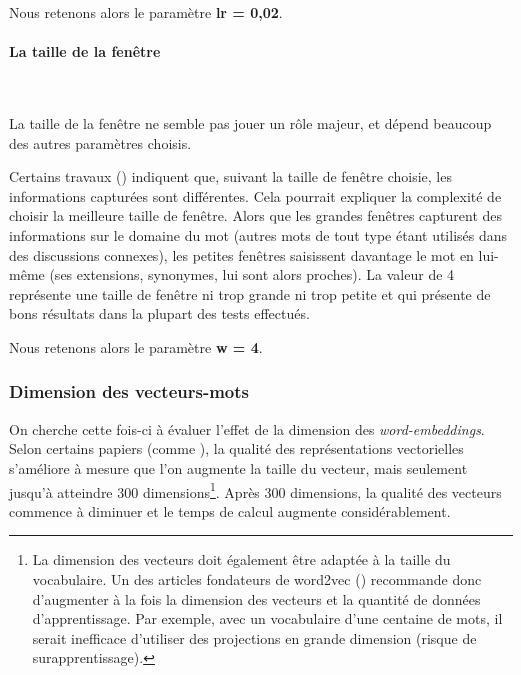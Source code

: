 \documentclass[11pt,french,french]{article}
\let\rmarkdownfootnote\footnote%
\def\footnote{\protect\rmarkdownfootnote}
\begin{document}
\faArrowCircleRight{} Nous retenons alors le paramètre \textbf{lr = 0,02}.

\hypertarget{la-taille-de-la-fenuxeatre}{%
\paragraph{La taille de la fenêtre}\label{la-taille-de-la-fenuxeatre}}

~

La taille de la fenêtre ne semble pas jouer un rôle majeur, et dépend beaucoup des autres paramètres choisis.

Certains travaux (\cite{Levy2}) indiquent que, suivant la taille de fenêtre choisie, les informations capturées sont différentes. Cela pourrait expliquer la complexité de choisir la \og meilleure \fg{} taille de fenêtre. Alors que les \og grandes \fg{} fenêtres capturent des informations sur le domaine du mot (autres mots de tout type étant utilisés dans des discussions connexes), les \og petites \fg{} fenêtres saisissent davantage le mot en lui-même (ses extensions, synonymes, lui sont alors proches). La valeur de 4 représente une taille de fenêtre \og ni trop grande ni trop petite\fg{} et qui présente de bons résultats dans la plupart des tests effectués.

\faArrowCircleRight{} Nous retenons alors le paramètre \textbf{w = 4}.

\hypertarget{dimension-des-vecteurs-mots}{%
\subsubsection{Dimension des vecteurs-mots}\label{dimension-des-vecteurs-mots}}

On cherche cette fois-ci à évaluer l'effet de la dimension des \emph{word-embeddings}. Selon certains papiers (comme \cite{Pennington}), la qualité des représentations vectorielles s'améliore à mesure que l'on augmente la taille du vecteur, mais seulement jusqu'à atteindre 300 dimensions\footnote{La dimension des vecteurs doit également être adaptée à la taille du vocabulaire. Un des articles fondateurs de word2vec (\cite{Mikolov}) recommande donc d'augmenter à la fois la dimension des vecteurs et la quantité de données d'apprentissage. Par exemple, avec un vocabulaire d'une centaine de mots, il serait inefficace d'utiliser des projections en grande dimension (risque de surapprentissage).}. Après 300 dimensions, la qualité des vecteurs commence à diminuer et le temps de calcul augmente considérablement.
\end{document}
